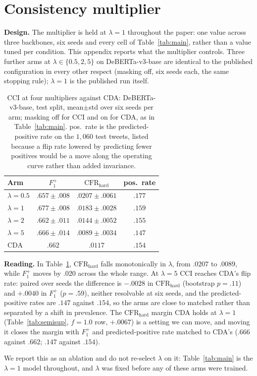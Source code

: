 \documentclass[11pt]{article}
\newcommand{\Fpos}{\ensuremath{F_1^{+}}\xspace}
\newcommand{\CFRh}{\ensuremath{\mathrm{CFR}_{\mathrm{hard}}}\xspace}
\begin{document}
\FloatBarrier
\section{Consistency multiplier}
\label{app:lambda}

\textbf{Design.} The multiplier is held at $\lambda{=}1$ throughout the paper:
one value across three backbones, six seeds and every cell of
Table~\ref{tab:main}, rather than a value tuned per condition. This appendix
reports what the multiplier controls. Three further arms at
$\lambda\in\{0.5,2,5\}$ on DeBERTa-v3-base are identical to the published
configuration in every other respect (masking off, six seeds each, the same stopping
rule); $\lambda{=}1$ is the published run itself.

\begin{table}[t]
\centering
\small
\begin{tabular}{lccc}
\toprule
Arm & \Fpos{} & \CFRh{} & pos.\ rate \\
\midrule
$\lambda{=}0.5$ & $.657{\pm}.008$ & $.0207{\pm}.0061$ & $.177$ \\
$\lambda{=}1$   & $.677{\pm}.008$ & $.0183{\pm}.0028$ & $.159$ \\
$\lambda{=}2$   & $.662{\pm}.011$ & $.0144{\pm}.0052$ & $.155$ \\
$\lambda{=}5$   & $.666{\pm}.014$ & $.0089{\pm}.0034$ & $.147$ \\
\midrule
CDA             & $.662$          & $.0117$            & $.154$ \\
\bottomrule
\end{tabular}
\caption{CCI at four multipliers against CDA: DeBERTa-v3-base, test split,
mean${\pm}$std over six seeds per arm; masking off for CCI and on for CDA, as in
Table~\ref{tab:main}. pos.\ rate is the predicted-positive rate on the $1{,}060$
test tweets, listed because a flip rate lowered by predicting fewer positives
would be a move along the operating curve rather than added invariance.}
\label{tab:lambda}
\end{table}

\textbf{Reading.} In Table~\ref{tab:lambda}, \CFRh{} falls monotonically in $\lambda$, from $.0207$ to
$.0089$, while \Fpos{} moves by $.020$ across the whole range. At $\lambda{=}5$
CCI reaches CDA's flip rate: paired over seeds the difference is $-.0028$ in
\CFRh{} (bootstrap $p{=}.11$) and $+.0040$ in \Fpos{} ($p{=}.59$), neither
resolvable at six seeds, and the predicted-positive rates are $.147$ against
$.154$, so the arms are close to matched rather than separated by a shift in
prevalence. The \CFRh{} margin CDA holds at $\lambda{=}1$
(Table~\ref{tab:semisup}, $f{=}1.0$ row, $+.0067$) is a setting we can move, and
moving it closes the margin with \Fpos{} and predicted-positive rate matched to
CDA's ($.666$ against $.662$; $.147$ against $.154$).

We report this as an ablation and do not re-select $\lambda$ on it:
Table~\ref{tab:main} is the $\lambda{=}1$ model throughout, and $\lambda$ was
fixed before any of these arms were trained.
\end{document}
